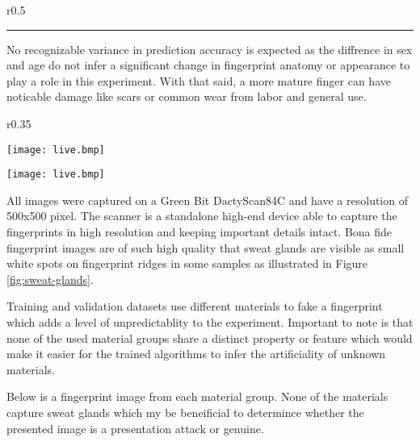 \begin{wrapfigure}[10]{r}{0.5\textwidth}
    \vspace{-5mm}
    
    \vspace{2mm}\hrule\vspace{2mm}
    

\end{wrapfigure}%

\medskip\noindent
No recognizable variance in prediction accuracy is expected as the diffrence in sex and age do not infer a significant change in fingerprint anatomy or appearance to play a role in this experiment.
With that said, a more mature finger can have noticable damage like scars or common wear from labor and general use.

\begin{wrapfigure}[9]{r}{0.35\textwidth}
    \vspace{-10mm}
    \begin{minipage}[r]{0.15\textwidth}
        \texttt{[image: live.bmp]}
        \caption{Bona Fide Fingerprint}\label{fig:finger-live}
    \end{minipage}
    \begin{minipage}[r]{0.15\textwidth}
        \texttt{[image: live.bmp]}
        \caption{Sweat Glands}\label{fig:sweat-glands}
    \end{minipage}
\end{wrapfigure}%

\medskip\noindent
All images were captured on a Green Bit DactyScan84C and have a resolution of 500x500 pixel.
The scanner is a standalone high-end device able to capture the fingerprints in high resolution and keeping important details intact.
Bona fide fingerprint images are of such high quality that sweat glands are visible as small white spots on fingerprint ridges in some samples as illustrated in Figure \ref{fig:sweat-glands}.

\medskip\noindent
Training and validation datasets use different materials to fake a fingerprint which adds a level of unpredictablity to the experiment.
Important to note is that none of the used material groups share a distinct property or feature which would make it easier for the trained algorithms to infer the artificiality of unknown materials.

\medskip\noindent
Below is a fingerprint image from each material group.
None of the materials capture sweat glands which my be beneificial to determince whether the presented image is a presentation attack or genuine.

